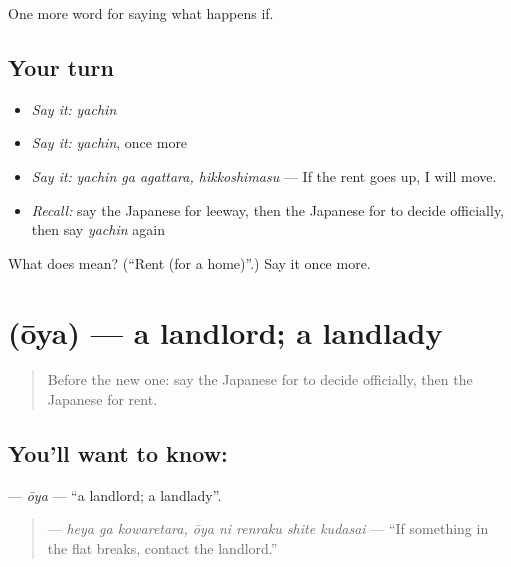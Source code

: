 \begin{grammarlens}[title={What you've built}]
One more word for saying what happens if.
\end{grammarlens}

\subsection*{Your turn}
\begin{itemize}
\raggedright
  \item \emph{Say it:} \emph{yachin}
  \item \emph{Say it:} \emph{yachin}, once more
  \item \emph{Say it:} \emph{yachin ga agattara, hikkoshimasu} — If the rent goes up, I will move.
  \item \emph{Recall:} say the Japanese for leeway, then the Japanese for to decide officially, then say \emph{yachin} again
\end{itemize}

\begin{tcolorbox}[breakable,colback=teal!4,colframe=teal!35!black,title={Before you move on}]
What does  mean? (\textquotedblleft{}Rent (for a home)\textquotedblright{}.) Say it once more.
\end{tcolorbox}
\section[\texorpdfstring{\ja{おおや} (ōya)}{おおや (ōya)}]{ (ōya) — a landlord; a landlady}

\label{lesson:JA-C358-ouya}



\begin{quote}
Before the new one: say the Japanese for to decide officially, then the Japanese for rent.
\end{quote}

\subsection*{You'll want to know: }
\textbf{} — \emph{ōya} — \textquotedblleft{}a landlord; a landlady\textquotedblright{}.

\begin{quote}
\textbf{   } — \emph{heya ga kowaretara, ōya ni renraku shite kudasai} — \textquotedblleft{}If something in the flat breaks, contact the landlord.\textquotedblright{}
\end{quote}

